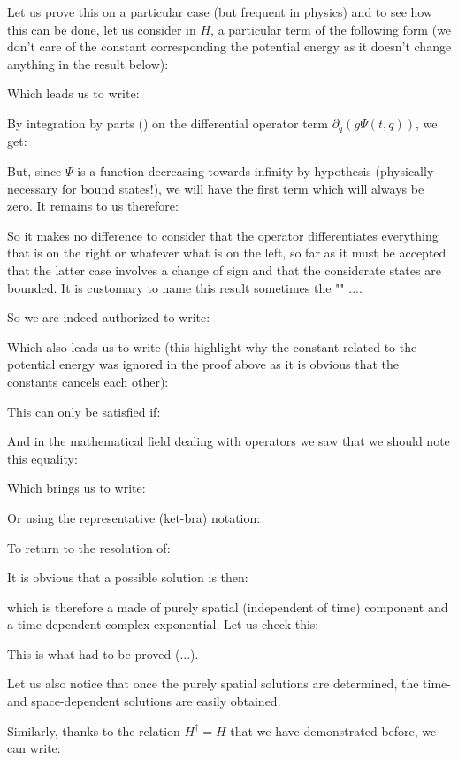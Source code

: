 	Let us prove this on a particular case (but frequent in physics) and to see how this can be done, let us consider in $H$, a particular term of the following form (we don't care of the constant corresponding the potential energy as it doesn't change anything in the result below):
	
	Which leads us to write:
	
	By integration by parts () on the differential operator term $\partial_q (g\Psi(t,q))$, we get:
	
	But, since $\Psi$  is a function decreasing towards infinity by hypothesis (physically necessary for bound states!), we will have the first term which will always be zero. It remains to us therefore:
	
	So it makes no difference to consider that the operator differentiates everything that is on the right or whatever what is on the left, so far as it must be accepted that the latter case involves a change of sign and that the considerate states are bounded. It is customary to name this result sometimes the "" ....
	
	So we are indeed authorized to write:
	
	Which also leads us to write (this highlight why the constant related to the potential energy was ignored in the proof above as it is obvious that the constants cancels each other):
	
	This can only be satisfied if:
	
	And in the mathematical field dealing with operators we saw that we should note this equality:
	
	Which brings us to write:
	
	Or using the representative (ket-bra) notation:
	
	To return to the resolution of:
	
	It is obvious that a possible solution is then:
	
	which is therefore a made of purely spatial (independent of time) component and a time-dependent complex exponential. Let us check this:
	
	This is what had to be proved (...).

	Let us also notice that once the purely spatial solutions are determined, the time- and space-dependent solutions are easily obtained.
	
	Similarly, thanks to the relation $H^\dagger=H$ that we have demonstrated before, we can write:
	

